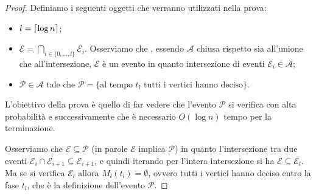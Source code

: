 \documentclass{article}
\begin{document}
\begin{proof}
    Definiamo i seguenti oggetti che verranno utilizzati nella prova:
    \begin{itemize}
        \item $l = \lceil \log{n} \rceil$;
        \item $\mathcal{E} = \bigcap_{i \in 
            \lbrace 0, \ldots, l \rbrace}{\mathcal{E}_i}$. Osserviamo che 
            , essendo $\mathcal{A}$  chiusa 
            rispetto sia all'unione che all'intersezione, $\mathcal{E}$ 
            \`e un evento in quanto intersezione di eventi $\mathcal{E}_i 
            \in \mathcal{A}$;
        \item $\mathcal{P} \in \mathcal{A}$ tale che $\mathcal{P} = 
            \lbrace \text{al tempo $t_l$ tutti i vertici hanno deciso} \rbrace$.
    \end{itemize}

    L'obiettivo della prova \`e quello di far vedere che l'evento 
    $\mathcal{P}$ si verifica con alta probabilit\`a e successivamente
    che \`e necessario $O(\log{n})$ tempo per la terminazione. 

    Osserviamo che $\mathcal{E}\subseteq\mathcal{P}$ (in parole $\mathcal{E}$ 
    implica $\mathcal{P}$) in quanto l'intersezione tra due eventi 
    $\mathcal{E}_i \cap \mathcal{E}_{i+1} \subseteq \mathcal{E}_{i+1}$,
    e quindi iterando per l'intera intersezione si ha $\mathcal{E} 
    \subseteq \mathcal{E}_l$. Ma se si verifica $\mathcal{E}_l$ allora
    $M_l(t_l) = \emptyset$, ovvero tutti i vertici hanno deciso entro la fase
    $t_l$, che \`e la definizione dell'evento $\mathcal{P}$.


\end{proof}
\end{document}
